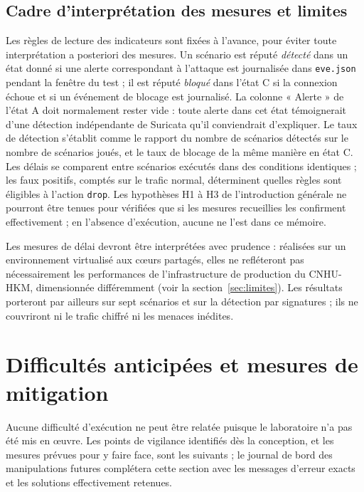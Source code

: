 
\subsection{Cadre d'interprétation des mesures et limites}

Les règles de lecture des indicateurs sont fixées à l'avance, pour éviter toute interprétation a posteriori des mesures. Un scénario est réputé \emph{détecté} dans un état donné si une alerte correspondant à l'attaque est journalisée dans \texttt{eve.json} pendant la fenêtre du test ; il est réputé \emph{bloqué} dans l'état C si la connexion échoue et si un événement de blocage est journalisé. La colonne « Alerte » de l'état A doit normalement rester vide : toute alerte dans cet état témoignerait d'une détection indépendante de Suricata qu'il conviendrait d'expliquer. Le taux de détection s'établit comme le rapport du nombre de scénarios détectés sur le nombre de scénarios joués, et le taux de blocage de la même manière en état C. Les délais se comparent entre scénarios exécutés dans des conditions identiques ; les faux positifs, comptés sur le trafic normal, déterminent quelles règles sont éligibles à l'action \texttt{drop}. Les hypothèses H1 à H3 de l'introduction générale ne pourront être tenues pour vérifiées que si les mesures recueillies les confirment effectivement ; en l'absence d'exécution, aucune ne l'est dans ce mémoire.

Les mesures de délai devront être interprétées avec prudence : réalisées sur un environnement virtualisé aux cœurs partagés, elles ne refléteront pas nécessairement les performances de l'infrastructure de production du CNHU-HKM, dimensionnée différemment (voir la section~\ref{sec:limites}). Les résultats porteront par ailleurs sur sept scénarios et sur la détection par signatures ; ils ne couvriront ni le trafic chiffré ni les menaces inédites.

\section{Difficultés anticipées et mesures de mitigation}

Aucune difficulté d'exécution ne peut être relatée puisque le laboratoire n'a pas été mis en œuvre. Les points de vigilance identifiés dès la conception, et les mesures prévues pour y faire face, sont les suivants ; le journal de bord des manipulations futures complétera cette section avec les messages d'erreur exacts et les solutions effectivement retenues.

